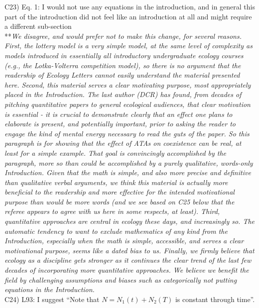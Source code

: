 \documentclass[letterpaper,11pt]{article}
\begin{document}
\noindent C23) Eq. 1: I would not use any equations in the introduction, and in general this part of the introduction did not feel like an introduction at all and might require a different sub-section \\

\noindent ***\emph{We disagree, and would prefer not to make this change, for several reasons. 
First, the lottery model is a very simple model, at the same level of complexity
as models introduced in essentially all introductory 
undergraduate ecology courses (e.g., the Lotka-Volterra competition model), so there is no argument that 
the readership of Ecology Letters cannot easily understand the material presented here.
Second, this material serves a clear motivating purpose, most appropriately placed in the Introduction. 
The last author (DCR) has found, from decades of pitching 
quantitative papers to general ecological audiences, that clear motivation is essential - it is crucial to demonstrate 
clearly that an effect one plans to elaborate is present, and potentially important, prior to asking the reader to engage 
the kind of mental energy necessary to read the guts of the paper. So this 
paragraph is for showing that the effect of ATAs on coexistence can be real, at least for a simple 
example. That goal is convincingly 
accomplished by the paragraph, more so than could be accomplished by a purely qualitative, words-only Introduction. 
Given that the math is simple, and also more precise and definitive than 
qualitative verbal arguments, we think this material is actually
more beneficial to the readership and more effective for the intended motivational purpose than would be more words
(and we see based on C25 below that the referee appears to agree with us here in some respects, at least). 
Third, quantitative approaches are central in ecology these days, and increasingly so. The automatic tendency
to want to exclude mathematics of any kind from the Introduction, especially when the math is simple,
accessible, and serves a clear motivational purpose, seems like a dated bias to us. 
Finally, we firmly believe that ecology as a discipline gets stronger as it continues the clear
trend of the last few decades of incorporating more quantitative approaches. We believe we
benefit the field by challenging assumptions and biases such as categorically not putting equations 
in the Introduction.} \\

\noindent C24) L93: I suggest ``Note that $N = N_1(t) + N_2(T)$ is constant through time''. \\
\end{document}
